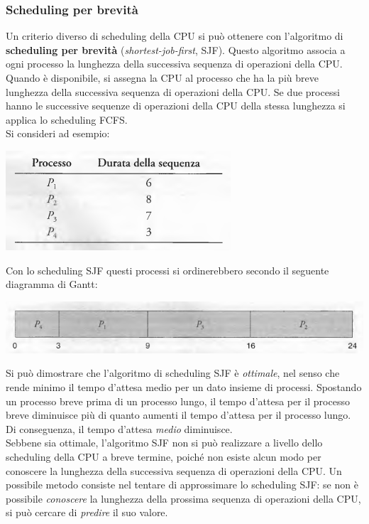 \documentclass[11pt,a4paper]{article}
\begin{document}
\subsubsection{Scheduling per brevità}
Un criterio diverso di scheduling della CPU si può ottenere con l'algoritmo di \textbf{scheduling
per brevità} (\emph{shortest-job-first}, SJF). Questo algoritmo associa a ogni processo la lunghezza
della successiva sequenza di operazioni della CPU. Quando è disponibile, si assegna la CPU al
processo che ha la più breve lunghezza della successiva sequenza di operazioni della CPU. Se
due processi hanno le successive sequenze di operazioni della CPU della stessa lunghezza si
applica lo scheduling FCFS.\medskip\\
Si consideri ad esempio:
\begin{center}
  \includegraphics[scale=0.6]{img/0018.png}
\end{center}
Con lo scheduling SJF questi processi si ordinerebbero secondo il seguente diagramma di
Gantt:
\begin{center}
  \includegraphics[scale=0.5]{img/0019.png}
\end{center}
Si può dimostrare che l'algoritmo di scheduling SJF è \emph{ottimale}, nel senso che rende mi­nimo il tempo d'attesa medio per un dato insieme di processi. Spostando un processo breve
prima di un processo lungo, il tempo d'attesa per il processo breve diminuisce più di quan­to aumenti il tempo d'attesa per il processo lungo. Di conseguenza, il tempo d'attesa \emph{medio}
diminuisce.\medskip\\
Sebbene sia ottimale, l'algoritmo SJF non si può realizzare a livello dello scheduling
della CPU a breve termine, poiché non esiste alcun modo per conoscere la lunghezza della
successiva sequenza di operazioni della CPU. Un possibile metodo consiste nel tentare di ap­prossimare lo scheduling SJF: se non è possibile \emph{conoscere} la lunghezza della prossima se­quenza di operazioni della CPU, si può cercare di \emph{predire} il suo valore.\medskip\\
\end{document}
